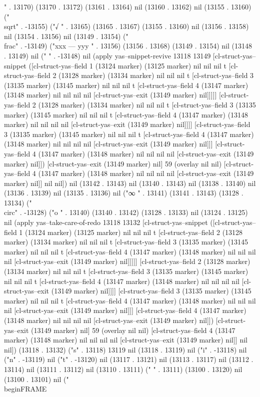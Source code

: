 " . 13170) (13170 . 13172) (13161 . 13164) nil (13160 . 13162) nil (13155 . 13160) ("\\sqrt" . -13155) ("√
" . 13165) (13165 . 13167) (13155 . 13160) nil (13156 . 13158) nil (13154 . 13156) nil (13149 . 13154) ("\\frac" . -13149) ("xxx
---
yyy
" . 13156) (13156 . 13168) (13149 . 13154) nil (13148 . 13149) nil (" " . -13148) nil (apply yas--snippet-revive 13118 13149 [cl-struct-yas--snippet ([cl-struct-yas--field 1 (13124 marker) (13125 marker) nil nil nil t [cl-struct-yas--field 2 (13128 marker) (13134 marker) nil nil nil t [cl-struct-yas--field 3 (13135 marker) (13145 marker) nil nil nil t [cl-struct-yas--field 4 (13147 marker) (13148 marker) nil nil nil nil [cl-struct-yas--exit (13149 marker) nil]]]]] [cl-struct-yas--field 2 (13128 marker) (13134 marker) nil nil nil t [cl-struct-yas--field 3 (13135 marker) (13145 marker) nil nil nil t [cl-struct-yas--field 4 (13147 marker) (13148 marker) nil nil nil nil [cl-struct-yas--exit (13149 marker) nil]]]] [cl-struct-yas--field 3 (13135 marker) (13145 marker) nil nil nil t [cl-struct-yas--field 4 (13147 marker) (13148 marker) nil nil nil nil [cl-struct-yas--exit (13149 marker) nil]]] [cl-struct-yas--field 4 (13147 marker) (13148 marker) nil nil nil nil [cl-struct-yas--exit (13149 marker) nil]]) [cl-struct-yas--exit (13149 marker) nil] 59 (overlay nil nil) [cl-struct-yas--field 4 (13147 marker) (13148 marker) nil nil nil nil [cl-struct-yas--exit (13149 marker) nil]] nil nil]) nil (13142 . 13143) nil (13140 . 13143) nil (13138 . 13140) nil (13136 . 13139) nil (13135 . 13136) nil ("∞
" . 13141) (13141 . 13143) (13128 . 13134) ("\\circ" . -13128) ("o
" . 13140) (13140 . 13142) (13128 . 13133) nil (13124 . 13125) nil (apply yas--take-care-of-redo 13118 13132 [cl-struct-yas--snippet ([cl-struct-yas--field 1 (13124 marker) (13125 marker) nil nil nil t [cl-struct-yas--field 2 (13128 marker) (13134 marker) nil nil nil t [cl-struct-yas--field 3 (13135 marker) (13145 marker) nil nil nil t [cl-struct-yas--field 4 (13147 marker) (13148 marker) nil nil nil nil [cl-struct-yas--exit (13149 marker) nil]]]]] [cl-struct-yas--field 2 (13128 marker) (13134 marker) nil nil nil t [cl-struct-yas--field 3 (13135 marker) (13145 marker) nil nil nil t [cl-struct-yas--field 4 (13147 marker) (13148 marker) nil nil nil nil [cl-struct-yas--exit (13149 marker) nil]]]] [cl-struct-yas--field 3 (13135 marker) (13145 marker) nil nil nil t [cl-struct-yas--field 4 (13147 marker) (13148 marker) nil nil nil nil [cl-struct-yas--exit (13149 marker) nil]]] [cl-struct-yas--field 4 (13147 marker) (13148 marker) nil nil nil nil [cl-struct-yas--exit (13149 marker) nil]]) [cl-struct-yas--exit (13149 marker) nil] 59 (overlay nil nil) [cl-struct-yas--field 4 (13147 marker) (13148 marker) nil nil nil nil [cl-struct-yas--exit (13149 marker) nil]] nil nil]) (13118 . 13132) ("s" . 13118) 13119 nil (13118 . 13119) nil ("i" . -13118) nil ("n" . -13119) nil ("t" . -13120) nil (13117 . 13121) nil (13113 . 13117) nil (13112 . 13114) nil (13111 . 13112) nil (13110 . 13111) (" " . 13111) (13100 . 13120) nil (13100 . 13101) nil ("\\begin{FRAME}
 

